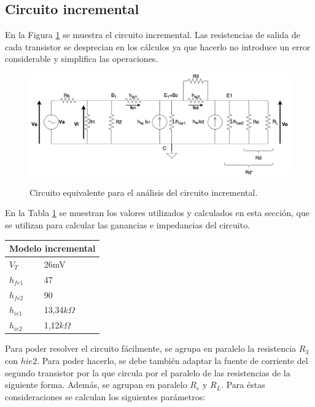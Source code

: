 	\subsection{Circuito incremental}
	
	En la Figura \ref{circ_incremental} se muestra el circuito incremental. Las resistencias de salida de cada transistor se desprecian en los cálculos ya que hacerlo no introduce un error considerable y simplifica las operaciones.
		\begin{figure}[H]
			\centering
			\includegraphics[scale=0.4]{./Imagenes/circ_incremental.png} \\
			\caption{Circuito equivalente para el an\'alisis del circuito incremental.}
			\label{circ_incremental}
		\end{figure}

En la Tabla \ref{tabla_valores_incremental} se muestran los valores utilizados y calculados en esta sección, que se utilizan para calcular las ganancias e impedancias del circuito.

\begin{table}[H]
\centering
\begin{tabular}{ll}
\multicolumn{2}{l}{Modelo incremental} \\ \hline
$V_T$              & 26mV             \\
$h_{fe1}$           & 47            \\
$h_{fe2}$           & 90            \\
$h_{ie1}$            & 13,34$k\Omega$            \\
$h_{ie2}$           & 1,12$k\Omega$             \\
\end{tabular}
\label{tabla_valores_incremental} 
\end{table}

Para poder resolver el circuito fácilmente, se agrupa en paralelo la resistencia $R_3$ con $hie2$. Para poder hacerlo, se debe también adaptar la fuente de corriente del segundo transistor por la que circula por el paralelo de las resistencias de la siguiente forma. Además, se agrupan en paralelo $R_e$ y $R_L$. Para éstas consideraciones se calculan los siguientes parámetros:

